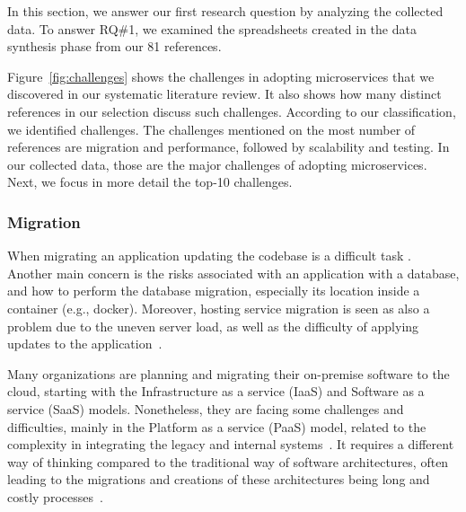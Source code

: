 In this section, we answer our first research question by analyzing the collected data.
To answer RQ\#1, we examined the spreadsheets created in the data synthesis phase from our 81 references.

Figure~\ref{fig:challenges} shows the challenges in adopting microservices that we discovered in our systematic literature review. It also shows how many distinct references in our selection discuss such challenges. 
According to our classification, we identified \challengecount challenges.
The challenges mentioned on the most number of references are migration and performance, followed by scalability and testing. In our collected data, those are the major challenges of adopting microservices. Next, we focus in more detail the top-10 challenges.


\subsubsection{Migration}%
When migrating an application updating the codebase is a difficult task \cite{Tuuli2020, wang2020}.
Another main concern is the risks associated with an application with a database, and how to perform the database migration, especially its location inside a container (e.g., docker)\cite{Tuuli2020}.
Moreover, hosting service migration is seen as also a problem due to the uneven server load, as well as the difficulty of applying updates to the application~\cite{Tuuli2020}.

Many organizations are planning and migrating their on-premise software to the cloud, starting with the Infrastructure as a service (IaaS) and Software as a service (SaaS) models. Nonetheless, they are facing some challenges and difficulties, mainly in the Platform as a service (PaaS) model, related to the complexity in integrating the legacy and internal systems~\cite{rosa2018}. It requires a different way of thinking compared to the traditional way of software architectures, often leading to the migrations and creations of these architectures being long and costly processes~\cite{Leo2019}.


